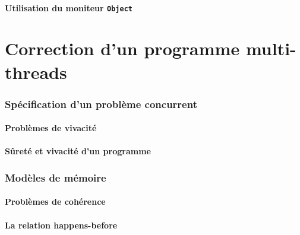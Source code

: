 \documentclass[9pt, handout]{beamer}
\begin{document}
\subsection{Utilisation du moniteur \lstinline{Object}}



 
 
\part{Correction d'un programme multi-threads}
 
\section{Spécification d'un problème concurrent}
 
\subsection{Problèmes de vivacité}





 
\subsection{Sûreté et vivacité d'un programme}




 
\section{Modèles de mémoire}
  
\subsection{Problèmes de cohérence}





 
\subsection{La relation happens-before}




 
\end{document}
